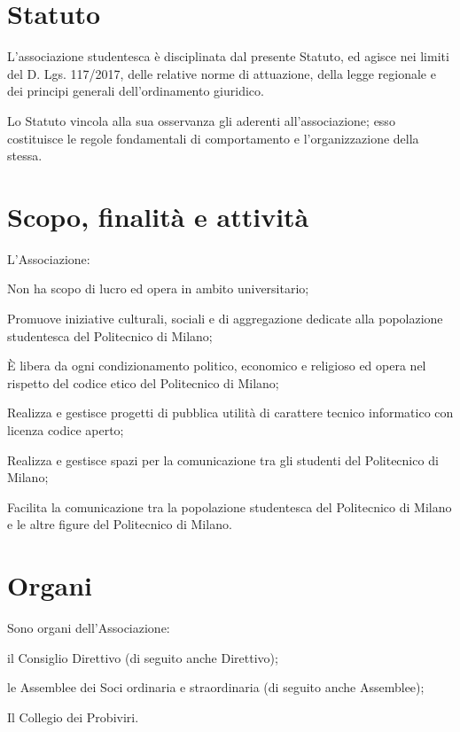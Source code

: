 \documentclass[legalpaper, 11pt]{exam}
\let\tempone\enumerate
\let\temptwo\endenumerate
\renewenvironment{enumerate}{\tempone\addtolength{\itemsep}{-0.45\baselineskip}}{\temptwo}
\begin{document}
{\section{Statuto}
\begin{enumerate}
 \item L’associazione studentesca è disciplinata dal presente Statuto, ed agisce nei limiti del D. Lgs. 117/2017, delle relative norme di attuazione, della legge regionale e dei principi generali dell’ordinamento giuridico.
 \item Lo Statuto vincola alla sua osservanza gli aderenti all’associazione; esso costituisce le regole fondamentali di comportamento e l’organizzazione della stessa.
\end{enumerate}

\section{Scopo, finalità e attività}
L’Associazione: 
\vspace{-5pt}
\begin{enumerate}
 \item Non ha scopo di lucro ed opera in ambito universitario;
 \item Promuove iniziative culturali, sociali e di aggregazione dedicate alla popolazione studentesca del Politecnico di Milano;
 \item È libera da ogni condizionamento politico, economico e religioso ed opera nel rispetto del codice etico del Politecnico di Milano;
 \item Realizza e gestisce progetti di pubblica utilità di carattere tecnico informatico con licenza codice aperto;
 \item Realizza e gestisce spazi per la comunicazione tra gli studenti del Politecnico di Milano;
 \item Facilita la comunicazione tra la popolazione studentesca del Politecnico di Milano e le altre figure del Politecnico di Milano.
\end{enumerate}

\section{Organi}
Sono organi dell’Associazione: 
\vspace{-5pt}
\begin{enumerate}
 \item il Consiglio Direttivo (di seguito anche Direttivo);
 \item le Assemblee dei Soci ordinaria e straordinaria (di seguito anche Assemblee);
 \item Il Collegio dei Probiviri.
\end{enumerate}

}
\end{document}
